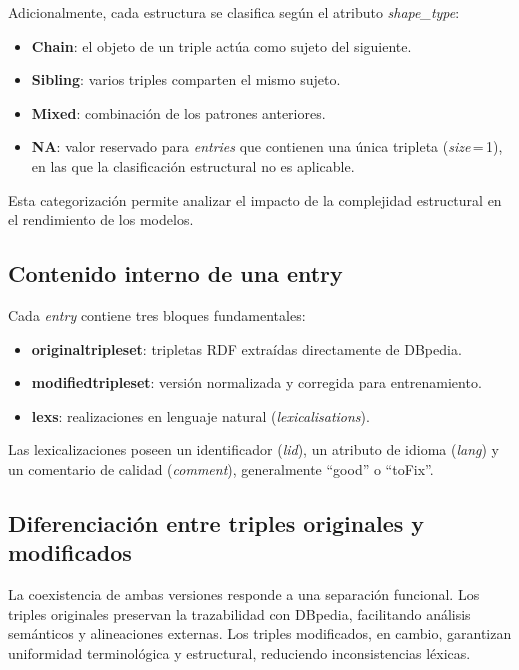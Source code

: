 Adicionalmente, cada estructura se clasifica según el atributo
\textit{shape\_type}:

\begin{itemize}
	\item \textbf{Chain}: el objeto de un triple actúa como sujeto del siguiente.
	\item \textbf{Sibling}: varios triples comparten el mismo sujeto.
	\item \textbf{Mixed}: combinación de los patrones anteriores.
	\item \textbf{NA}: valor reservado para \textit{entries} que contienen una única
	      tripleta (\textit{size}\,=\,1), en las que la clasificación estructural no es
	      aplicable.
\end{itemize}

Esta categorización permite analizar el impacto de la complejidad estructural
en el rendimiento de los modelos.

\subsection{Contenido interno de una entry}

Cada \textit{entry} contiene tres bloques fundamentales:

\begin{itemize}
	\item \textbf{originaltripleset}: tripletas RDF extraídas directamente de DBpedia.
	\item \textbf{modifiedtripleset}: versión normalizada y corregida para entrenamiento.
	\item \textbf{lexs}: realizaciones en lenguaje natural (\textit{lexicalisations}).
\end{itemize}

Las lexicalizaciones poseen un identificador (\textit{lid}), un atributo de
idioma (\textit{lang}) y un comentario de calidad (\textit{comment}),
generalmente ``good'' o ``toFix''.

\subsection{Diferenciación entre triples originales y modificados}

La coexistencia de ambas versiones responde a una separación funcional. Los
triples originales preservan la trazabilidad con DBpedia, facilitando análisis
semánticos y alineaciones externas. Los triples modificados, en cambio,
garantizan uniformidad terminológica y estructural, reduciendo inconsistencias
léxicas.

